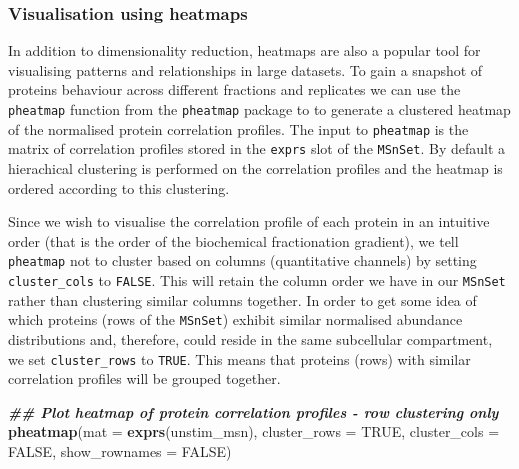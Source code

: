 \documentclass[9pt,a4paper,]{extarticle}
\newenvironment{Shaded}{\begin{snugshade}}{\end{snugshade}}
\newcommand{\AttributeTok}[1]{\textcolor[rgb]{0.13,0.29,0.53}{#1}}
\newcommand{\ConstantTok}[1]{\textcolor[rgb]{0.56,0.35,0.01}{#1}}
\newcommand{\DocumentationTok}[1]{\textcolor[rgb]{0.56,0.35,0.01}{\textbf{\textit{#1}}}}
\newcommand{\FunctionTok}[1]{\textcolor[rgb]{0.13,0.29,0.53}{\textbf{#1}}}
\newcommand{\NormalTok}[1]{#1}
\begin{document}
\subsubsection{Visualisation using heatmaps}\label{visualisation-using-heatmaps}

In addition to dimensionality reduction, heatmaps are also a popular tool for
visualising patterns and relationships in large datasets. To gain a snapshot of
proteins behaviour across different fractions and replicates we can use
the \texttt{pheatmap} function from the \texttt{pheatmap} package to to generate a clustered
heatmap of the normalised protein correlation profiles. The input to \texttt{pheatmap} is the matrix of correlation
profiles stored in the \texttt{exprs} slot of the \texttt{MSnSet}. By default a hierachical
clustering is performed on the correlation profiles and the heatmap is ordered
according to this clustering.

Since we wish to visualise the correlation profile of each protein in an intuitive
order (that is the order of the biochemical fractionation gradient), we tell
\texttt{pheatmap} not to cluster based on columns (quantitative channels) by setting
\texttt{cluster\_cols} to \texttt{FALSE}. This will retain the column order we have in our
\texttt{MSnSet} rather than clustering similar columns together. In order to get some
idea of which proteins (rows of the \texttt{MSnSet}) exhibit similar normalised abundance
distributions and, therefore, could reside in the same subcellular compartment, we
set \texttt{cluster\_rows} to \texttt{TRUE}. This means that proteins (rows) with similar
correlation profiles will be grouped together.

\begin{Shaded}
\begin{Highlighting}[]
\DocumentationTok{\#\# Plot heatmap of protein correlation profiles {-} row clustering only}
\FunctionTok{pheatmap}\NormalTok{(}\AttributeTok{mat =} \FunctionTok{exprs}\NormalTok{(unstim\_msn),}
         \AttributeTok{cluster\_rows =} \ConstantTok{TRUE}\NormalTok{,}
         \AttributeTok{cluster\_cols =} \ConstantTok{FALSE}\NormalTok{,}
         \AttributeTok{show\_rownames =} \ConstantTok{FALSE}\NormalTok{)}
\end{Highlighting}
\end{Shaded}
\end{document}
